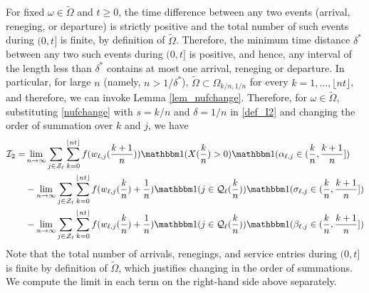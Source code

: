 \documentclass{article}
\theoremstyle{definition}
\numberwithin{equation}{section}
\begin{document}
For fixed $\omega\in\tilde\Omega$ and $t\geq0$, the time difference between any two events (arrival, reneging, or departure) is strictly positive and the total number of such events during $(0,t]$ is finite, by definition of $\tilde\Omega$.  Therefore, the minimum time distance $\delta^*$ between any two such events during $(0,t]$ is positive, and hence, any interval of the length less than $\delta^*$ contains at most one arrival, reneging or departure. In particular, for large $n$ (namely, $n>1/\delta^*$), $\tilde\Omega\subset\Omega_{k/n,1/n}$ for every $k=1,...,\lfloor nt \rfloor$, and therefore, we can invoke Lemma \ref{lem_nufchange}. Therefore, for $\omega\in\tilde\Omega$, substituting \eqref{nufchange} with $s=k/n$ and $\delta=1/n$ in \eqref{def_I2} and changing the order of summation over $k$ and $j$, we have
\begin{subequations}\label{I2}
\begin{align}
  \mathcal{I}_2= & \lim_{n\to\infty}\sum_{j\in\indexSet_\ell}\sum_{k=0}^{\lfloor nt\rfloor}  f(w_{\ell,j}(\frac{k+1}{n}))\indicil{X(\frac{k}{n})>0} \indicil{\arrivaltime_{\ell,j}\in(\frac{k}{n},\frac{k+1}{n}]}\label{I2_arrival}\\
      &- \lim_{n\to\infty}\sum_{j\in\indexSet_\ell}\sum_{k=0}^{\lfloor nt\rfloor}  f(w_{\ell,j}(\frac{k}{n})+\frac{1}{n}) \indicil{j\in\inque_\ell(\frac{k}{n})}\indicil{\renegtime_{\ell,j}\in(\frac{k}{n},\frac{k+1}{n}]} \label{I2_reneg}\\
            &-\lim_{n\to\infty}\sum_{j\in\indexSet_\ell}\sum_{k=0}^{\lfloor nt\rfloor} f(w_{\ell,j}(\frac{k}{n})+\frac{1}{n})\indicil{j\in\inque_\ell(\frac{k}{n})}\indicil{\entrytime_{\ell,j}\in(\frac{k}{n},\frac{k+1}{n}]}\label{I2_K1}
\end{align}
\end{subequations}
Note that the total number of arrivals, renegings, and service entries during $(0,t]$ is finite by definition of $\tilde\Omega$, which justifies changing in the order of summations. We compute the limit in each term on the right-hand side above separately.
\end{document}

